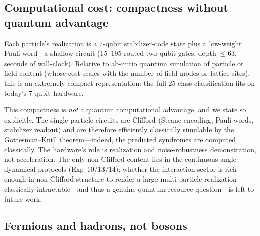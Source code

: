 \documentclass[11pt]{article}
\begin{document}
\subsection{Computational cost: compactness without quantum advantage}
\label{sec:compactness}

Each particle's realization is a $7$-qubit stabilizer-code state plus a low-weight Pauli word---a shallow circuit ($15$--$195$ routed two-qubit gates, depth $\le 63$, seconds of wall-clock).  Relative to ab-initio quantum simulation of particle or field content (whose cost scales with the number of field modes or lattice sites), this is an extremely compact representation: the full $25$-class classification fits on today's $7$-qubit hardware.

This compactness is \emph{not} a quantum computational advantage, and we state so explicitly.  The single-particle circuits are Clifford (Steane encoding, Pauli words, stabilizer readout) and are therefore efficiently classically simulable by the Gottesman--Knill theorem---indeed, the predicted syndromes are computed classically.  The hardware's role is realization and noise-robustness demonstration, not acceleration.  The only non-Clifford content lies in the continuous-angle dynamical protocols (Exp~10/13/14); whether the interaction sector is rich enough in non-Clifford structure to render a large multi-particle realization classically intractable---and thus a genuine quantum-resource question---is left to future work.

\subsection{Fermions and hadrons, not bosons}
\label{sec:fermion-hadron-scope}
\end{document}
